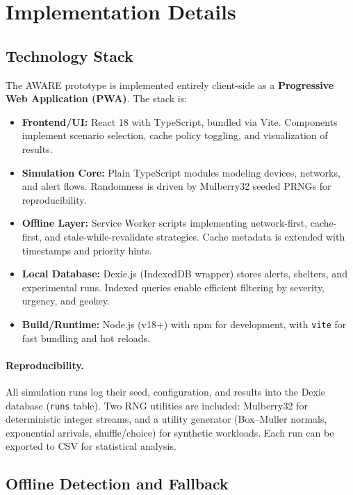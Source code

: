 \documentclass[11pt,twocolumn]{article}
\begin{document}
\section{Implementation Details}

\subsection{Technology Stack}

The AWARE prototype is implemented entirely client-side as a \textbf{Progressive Web Application (PWA)}. The stack is:

\begin{itemize}
    \item \textbf{Frontend/UI:} React 18 with TypeScript, bundled via Vite. Components implement scenario selection, cache policy toggling, and visualization of results.
    \item \textbf{Simulation Core:} Plain TypeScript modules modeling devices, networks, and alert flows. Randomness is driven by Mulberry32 seeded PRNGs for reproducibility.
    \item \textbf{Offline Layer:} Service Worker scripts implementing network-first, cache-first, and stale-while-revalidate strategies. Cache metadata is extended with timestamps and priority hints.
    \item \textbf{Local Database:} Dexie.js (IndexedDB wrapper) stores alerts, shelters, and experimental runs. Indexed queries enable efficient filtering by severity, urgency, and geokey.
    \item \textbf{Build/Runtime:} Node.js (v18+) with npm for development, with \texttt{vite} for fast bundling and hot reloads.
\end{itemize}

\paragraph{Reproducibility.}
All simulation runs log their seed, configuration, and results into the Dexie database (\texttt{runs} table). Two RNG utilities are included: Mulberry32 for deterministic integer streams, and a utility generator (Box--Muller normals, exponential arrivals, shuffle/choice) for synthetic workloads. Each run can be exported to CSV for statistical analysis.

\subsection{Offline Detection and Fallback}
\end{document}
